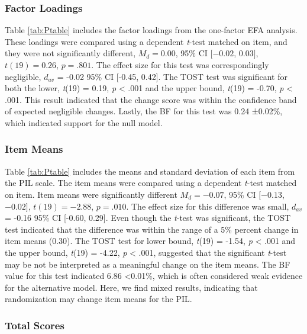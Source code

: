 \documentclass[english,man, mask]{apa6}
\theoremstyle{definition}
\theoremstyle{definition}
\theoremstyle{definition}
\theoremstyle{remark}
\begin{document}
\subsubsection{Factor Loadings}\label{factor-loadings}

Table \ref{tab:Ptable} includes the factor loadings from the one-factor
EFA analysis. These loadings were compared using a dependent
\emph{t}-test matched on item, and they were not significantly
different, \(M_d = 0.00\), 95\% CI \([-0.02\), \(0.03]\),
\(t(19) = 0.26\), \(p = .801\). The effect size for this test was
correspondingly negligible, \(d_{av}\) = -0.02 95\% CI {[}-0.45,
0.42{]}. The TOST test was significant for both the lower, \emph{t}(19)
= 0.19, \emph{p} \textless{} .001 and the upper bound, \emph{t}(19) =
-0.70, \emph{p} \textless{} .001. This result indicated that the change
score was within the confidence band of expected negligible changes.
Lastly, the BF for this test was 0.24 ±0.02\%, which indicated support
for the null model.

\subsubsection{Item Means}\label{item-means}

Table \ref{tab:Ptable} includes the means and standard deviation of each
item from the PIL scale. The item means were compared using a dependent
\emph{t}-test matched on item. Item means were significantly different
\(M_d = -0.07\), 95\% CI \([-0.13\), \(-0.02]\), \(t(19) = -2.88\),
\(p = .010\). The effect size for this difference was small, \(d_{av}\)
= -0.16 95\% CI {[}-0.60, 0.29{]}. Even though the \emph{t}-test was
significant, the TOST test indicated that the difference was within the
range of a 5\% percent change in item means (0.30). The TOST test for
lower bound, \emph{t}(19) = -1.54, \emph{p} \textless{} .001 and the
upper bound, \emph{t}(19) = -4.22, \emph{p} \textless{} .001, suggested
that the significant \emph{t}-test may be not be interpreted as a
meaningful change on the item means. The BF value for this test
indicated 6.86 \textless{}0.01\%, which is often considered weak
evidence for the alternative model. Here, we find mixed results,
indicating that randomization may change item means for the PIL.

\subsubsection{Total Scores}\label{total-scores}
\end{document}
